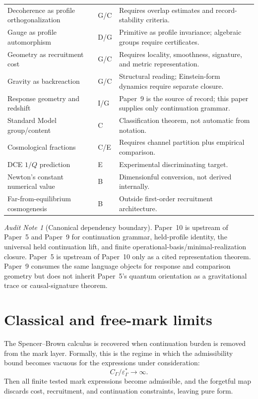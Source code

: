 \documentclass[11pt]{article}
\theoremstyle{remark}
\newtheorem{audit}[theorem]{Audit Note}
\newcommand{\G}{\Gamma}
\newcommand{\floor}{\varepsilon^{\!*}_{\G}}
\newcommand{\Status}[1]{\textsf{#1}}
\begin{document}
\begin{center}
\begin{longtable}{p{}p{}p{}}
Decoherence as profile orthogonalization & \Status{G/C} & Requires overlap estimates and record-stability criteria.\\
Gauge as profile automorphism & \Status{D/G} & Primitive as profile invariance; algebraic groups require certificates.\\
Geometry as recruitment cost & \Status{G/C} & Requires locality, smoothness, signature, and metric representation.\\
Gravity as backreaction & \Status{G/C} & Structural reading; Einstein-form dynamics require separate closure.\\
Response geometry and redshift & \Status{I/G} & Paper~9 is the source of record; this paper supplies only continuation grammar.\\
Standard Model group/content & \Status{C} & Classification theorem, not automatic from notation.\\
Cosmological fractions & \Status{C/E} & Requires channel partition plus empirical comparison.\\
DCE \(1/Q\) prediction & \Status{E} & Experimental discriminating target.\\
Newton's constant numerical value & \Status{B} & Dimensionful conversion, not derived internally.\\
Far-from-equilibrium cosmogenesis & \Status{B} & Outside first-order recruitment architecture.\\
\bottomrule
\end{longtable}
\end{center}

\begin{audit}[Canonical dependency boundary]
Paper~10 is upstream of Paper~5 and Paper~9 for continuation grammar, held-profile identity, the universal held continuation lift, and finite operational-basis/minimal-realization closure.  Paper~5 is upstream of Paper~10 only as a cited representation theorem.  Paper~9 consumes the same language objects for response and comparison geometry but does not inherit Paper~5's quantum orientation as a gravitational trace or causal-signature theorem.
\end{audit}

\section{Classical and free-mark limits}

The Spencer--Brown calculus is recovered when continuation burden is removed from the mark layer.  Formally, this is the regime in which the admissibility bound becomes vacuous for the expressions under consideration:
\[
        C_\G/\floor\to\infty.
\]
Then all finite tested mark expressions become admissible, and the forgetful map discards cost, recruitment, and continuation constraints, leaving pure form.
\end{document}
